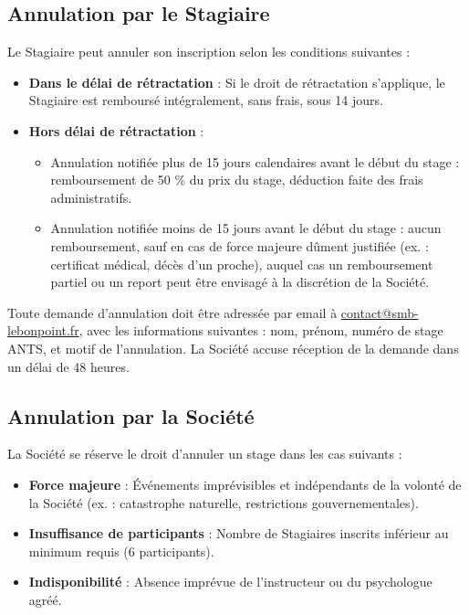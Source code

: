 \documentclass[a4paper,12pt]{article}
\begin{document}
\subsection{Annulation par le Stagiaire}
Le Stagiaire peut annuler son inscription selon les conditions suivantes :
\begin{itemize}
    \item \textbf{Dans le délai de rétractation} : Si le droit de rétractation s'applique, le Stagiaire est remboursé intégralement, sans frais, sous 14 jours.
    \item \textbf{Hors délai de rétractation} :
    \begin{itemize}
        \item Annulation notifiée plus de 15 jours calendaires avant le début du stage : remboursement de 50 \% du prix du stage, déduction faite des frais administratifs.
        \item Annulation notifiée moins de 15 jours avant le début du stage : aucun remboursement, sauf en cas de force majeure dûment justifiée (ex. : certificat médical, décès d'un proche), auquel cas un remboursement partiel ou un report peut être envisagé à la discrétion de la Société.
    \end{itemize}
\end{itemize}

Toute demande d'annulation doit être adressée par email à \href{mailto:contact@smb-lebonpoint.fr}{contact@smb-lebonpoint.fr}, avec les informations suivantes : nom, prénom, numéro de stage ANTS, et motif de l'annulation. La Société accuse réception de la demande dans un délai de 48 heures.

\subsection{Annulation par la Société}
La Société se réserve le droit d'annuler un stage dans les cas suivants :
\begin{itemize}
    \item \textbf{Force majeure} : Événements imprévisibles et indépendants de la volonté de la Société (ex. : catastrophe naturelle, restrictions gouvernementales).
    \item \textbf{Insuffisance de participants} : Nombre de Stagiaires inscrits inférieur au minimum requis (6 participants).
    \item \textbf{Indisponibilité} : Absence imprévue de l'instructeur ou du psychologue agréé.
\end{itemize}
\end{document}
